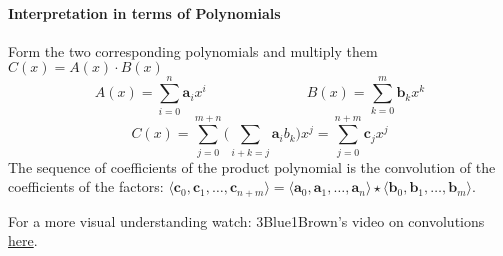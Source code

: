 \paragraph{Interpretation in terms of Polynomials}
Form the two corresponding polynomials and multiply them \(C(x) = A(x) \cdot B(x)\)
\[A(x) = \sum_{i=0}^n \boldsymbol{a}_ix^i \hspace{3cm} B(x) = \sum_{k=0}^m \boldsymbol{b}_kx^k\]
\[
    C(x) = \sum_{j=0}^{m+n} \biggl( \sum_{i+k=j} \boldsymbol{a}_i{b}_k \biggl) x^j 
    = \sum_{j=0}^{n+m} \boldsymbol{c}_jx^j
\]
The sequence of coefficients of the product polynomial is the convolution of the
coefficients of the factors:
\(\langle \bm{c}_0, \bm{c}_1, \dots, \bm{c}_{n+m} \rangle 
= \langle \bm{a}_0, \bm{a}_1, \dots, \bm{a}_{n} \rangle \star 
\langle \bm{b}_0, \bm{b}_1, \dots, \bm{b}_{m} \rangle\). 

For a more visual understanding watch: 3Blue1Brown's video on convolutions 
\href{https://www.youtube.com/watch?v=KuXjwB4LzSA}{here}.